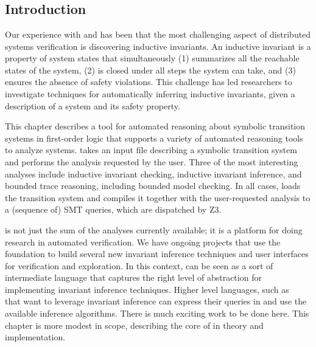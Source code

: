 \chapter{\mypyvy}
\label{chap:mypyvy}

\section{Introduction}

Our experience with \Verdi and \disel has been
  that the most challenging aspect of distributed systems verification
  is discovering inductive invariants.
An inductive invariant is a property of system states that simultaneously
  (1) summarizes all the reachable states of the system,
  (2) is closed under all steps the system can take, and
  (3) ensures the absence of safety violations.
This challenge has led researchers to investigate
  techniques for automatically inferring inductive invariants,
  given a description of a system and its safety property.

This chapter describes \mypyvy
  a tool for automated reasoning
  about symbolic transition systems in first-order logic
  that supports a variety of automated reasoning tools to analyze systems.
\mypyvy takes an input file
  describing a symbolic transition system
  and performs the analysis requested by the user.
Three of the most interesting analyses include
  inductive invariant checking,
  inductive invariant inference, and
  bounded trace reasoning, including bounded model checking.
In all cases, \mypyvy loads the transition system
  and compiles it together with the user-requested analysis
  to a (sequence of) SMT queries,
  which are dispatched by Z3.

\mypyvy is not just the sum of the analyses currently available;
  it is a platform for doing research in automated verification.
We have ongoing projects that use the \mypyvy foundation
  to build several new invariant inference techniques
  and user interfaces for verification and exploration.
In this context, \mypyvy can be seen as a sort of intermediate language
  that captures the right level of abstraction for implementing
  invariant inference techniques.
Higher level languages, such as \ivy~\cite{Padon-al:PLDI16}
  that want to leverage invariant inference
  can express their queries in \mypyvy and
  use the available inference algorithms.
There is much exciting work to be done here.
This chapter is more modest in scope,
  describing the core of \mypyvy in theory and implementation.

